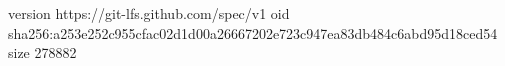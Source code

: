 version https://git-lfs.github.com/spec/v1
oid sha256:a253e252c955cfac02d1d00a26667202e723c947ea83db484c6abd95d18ced54
size 278882
